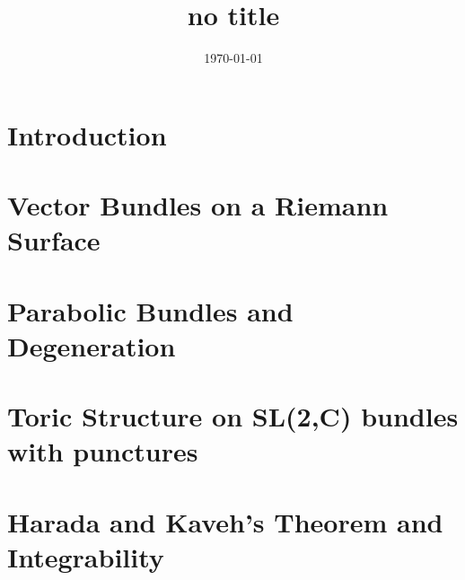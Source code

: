 \documentclass[]{article}
\title{no title}
\date{\today}
\begin{document}
\section{Introduction}
\section{Vector Bundles on a Riemann Surface}
\section{Parabolic Bundles and Degeneration}
\section{Toric Structure on SL(2,C) bundles with punctures}
\section{Harada and Kaveh's Theorem and Integrability}
\end{document}
